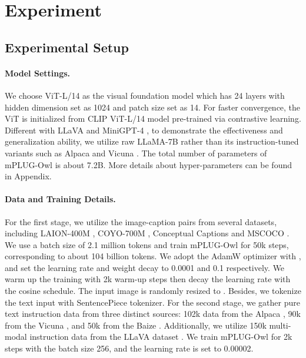 \documentclass{article}
\newcommand{\modelname}{mPLUG-Owl\xspace}
\begin{document}
\section{Experiment}
\subsection{Experimental Setup}
\paragraph{Model Settings.}We choose ViT-L/14 \citep{vit} as the visual foundation model  which has 24 layers with hidden dimension set as 1024 and patch size set as 14. For faster convergence, the ViT is initialized from CLIP ViT-L/14 model pre-trained via contrastive learning. Different with LLaVA \citep{llava} and MiniGPT-4 \citep{minigpt4}, to demonstrate the effectiveness and generalization ability, we utilize raw LLaMA-7B \citep{llama} rather than its instruction-tuned variants such as Alpaca \citep{alpaca} and Vicuna \citep{vicuna}. The total number of parameters of \modelname is about 7.2B. More details about hyper-parameters can be found in Appendix.

\paragraph{Data and Training Details.} For the first stage, we utilize the image-caption pairs from several datasets, including LAION-400M \citep{laion400m}, COYO-700M \citep{coyo700m}, Conceptual Captions \citep{conceptualcap} and MSCOCO \citep{cococap}. We use a batch size of 2.1 million tokens and train \modelname for 50k steps, corresponding to about 104 billion tokens. We adopt the AdamW optimizer with , and set the learning rate and weight decay to 0.0001 and 0.1 respectively. We warm up the training with 2k warm-up steps then decay the learning rate with the cosine schedule. The input image is randomly resized to . Besides, we tokenize the text input with SentencePiece \citep{sentencepiece} tokenizer. 
For the second stage, we gather pure text instruction data from three distinct sources: 102k data from the Alpaca \citep{alpaca}, 90k from the Vicuna \citep{vicuna}, and 50k from the Baize \citep{baize}. Additionally, we utilize 150k multi-modal instruction data from the LLaVA dataset \citep{llava}.
We train \modelname for 2k steps with the batch size 256, and the learning rate is set to 0.00002.
\end{document}
